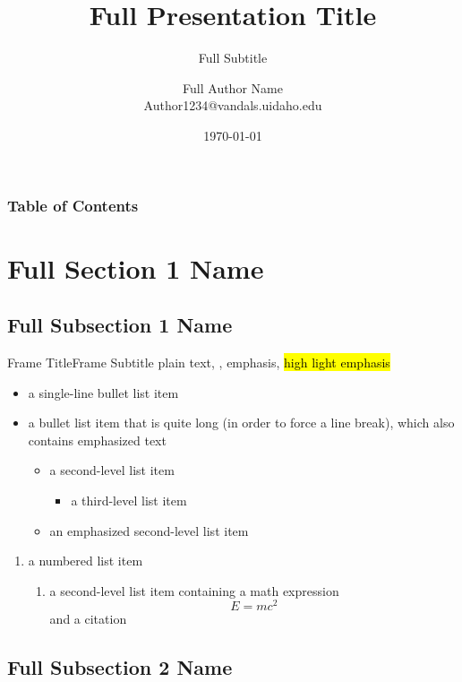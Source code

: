 \documentclass[
]{beamer}
\title[Short Presentation Title]{Full Presentation Title}
\subtitle[Short Subtitle]{Full Subtitle}
\author[Short Name or Initials]{Full Author Name\texorpdfstring{\\}{, }Author1234@vandals.uidaho.edu}
\institute[U of I]{University of Idaho}
\date{\today}
\makeatletter
\let\HL\hl
\renewcommand\hl{%
  \let\set@color\beamerorig@set@color
  \let\reset@color\beamerorig@reset@color
  \HL}
\makeatother
\begin{document}
\begin{frame}%
\maketitle
\end{frame}

\begin{frame}
\frametitle{Table of Contents}
\tableofcontents
\end{frame}
\section[Short Section 1 Name]{Full Section 1 Name}
\subsection[Short Subsection 1 Name]{Full Subsection 1 Name}

\begin{frame}{Frame Title}{Frame Subtitle}
plain text, , \alert{emphasis}, \hl{high light emphasis}
\begin{itemize}
  \item a single-line bullet list item
  \item a bullet list item that is quite long (in order to force a line break),
    which also contains \alert{emphasized text}
  \begin{itemize}
    \item a second-level list item
    \begin{itemize}
      \item a third-level list item
    \end{itemize}
    \item \alert{an emphasized second-level list item}
  \end{itemize}
\end{itemize}
\begin{enumerate}
  \item a numbered list item
  \begin{enumerate}
    \item a second-level list item containing a math expression
      \[ E = mc^2 \]
      and a citation \cite{einstein1905tragheit}
  \end{enumerate}
\end{enumerate}
\end{frame}


\subsection[Short Subsection 2 Name]{Full Subsection 2 Name}
\end{document}
